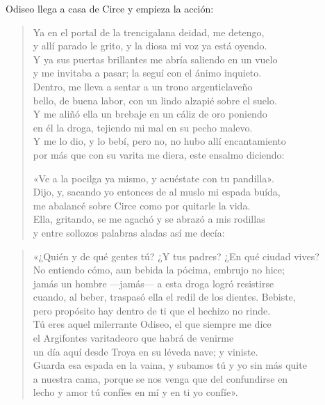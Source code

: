 \documentclass[11pt,a4paper]{article}
\begin{document}
Odiseo llega a casa de Circe y empieza la acción:

\begin{verse}
Ya en el portal de la trencigalana deidad, me detengo,\\
y allí parado le grito, y la diosa mi voz ya está oyendo.\\
Y ya sus puertas brillantes me abría saliendo en un vuelo\\
y me invitaba a pasar; la seguí con el ánimo inquieto.\\
Dentro, me lleva a sentar a un trono argenticlaveño\\
bello, de buena labor, con un lindo alzapié sobre el suelo.\\
Y me aliñó ella un brebaje en un cáliz de oro poniendo\\
en él la droga, tejiendo mi mal en su pecho malevo.\\
Y me lo dio, y lo bebí, pero no, no hubo allí encantamiento\\
por más que con su varita me diera, este ensalmo diciendo:

«Ve a la pocilga ya mismo, y acuéstate con tu pandilla».\\
Dijo, y, sacando yo entonces de al muslo mi espada buída,\\
me abalancé sobre Circe como por quitarle la vida.\\
Ella, gritando, se me agachó y se abrazó a mis rodillas\\
y entre sollozos palabras aladas así me decía:
\end{verse}

\begin{verse}
«¿Quién y de qué gentes tú? ¿Y tus padres? ¿En qué ciudad vives?\\
No entiendo cómo, aun bebida la pócima, embrujo no hice;\\
jamás un hombre ---jamás--- a esta droga logró resistirse\\
cuando, al beber, traspasó ella el redil de los dientes. Bebiste,\\
pero propósito hay dentro de ti que el hechizo no rinde.\\
Tú eres aquel milerrante Odiseo, el que siempre me dice\\
el Argifontes varitadeoro que habrá de venirme\\
un día aquí desde Troya en su léveda nave; y viniste.\\
Guarda esa espada en la vaina, y subamos tú y yo sin más quite\\
a nuestra cama, porque se nos venga que del confundirse en\\
lecho y amor tú confíes en mí y en ti yo confíe».
\end{verse}
\end{document}
